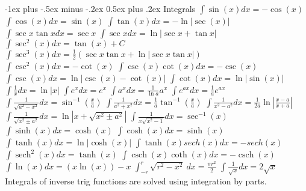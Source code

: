 \documentclass[10pt,a4paper,landscape]{article}
\makeatletter
\DeclareMathOperator{\sech}{sech}
\DeclareMathOperator{\csch}{csch}
\renewcommand{\section}{\@startsection{section}{1}{0mm}%
{-1ex plus -.5ex minus -.2ex}%
{0.5ex plus .2ex}%
{\normalfont\large\bfseries}}
\makeatother
\begin{document}
\begin{multicols*}{5}
	\section{Integrals}
	\scriptsize
	$\int \sin(x) dx = -\cos(x) $\newline
	$\int \cos(x) dx = \sin(x) $\newline
	$\int \tan(x) dx = -\ln|\sec(x) | $\newline
	$\int \sec x \tan x dx = \sec x $\newline
	$\int \sec x dx = \ln | \sec x + \tan x |$\newline 
	$\int \sec^2(x) dx = \tan(x) + C $ 
	$\int \sec^3(x) dx= \frac{1}{2}(\sec x \tan x + \ln| \sec x \tan x |)  $ 
	$\int \csc^2(x) dx= -\cot(x)$\newline
	$\int \csc (x) \cot (x) dx = - \csc(x)$\newline
	$\int \csc (x) dx = \ln | \csc (x) - \cot (x) | $\newline
	$\int \cot(x) dx = \ln|\sin(x)| $\newline
	$\int \frac{1}{x}dx = \ln|x|$\newline
	$\int e^x dx = e^x $\newline
	$\int a^x dx = \frac{1}{\ln a} a^x $\newline
	$\int e^{ax} dx = \frac{1}{a} e^{ax} $\newline
	$\int \frac{1}{\sqrt{a^2-x^2}} dx = \sin^{-1}(\frac{x}{a}) $\newline
	$\int \frac{1}{a^2+x^2} dx = \frac{1}{a} \tan^{-1}(\frac{x}{a}) $\newline
	$\int \frac{1}{x^2-a^2} dx = \frac{1}{2a} \ln |\frac{x-a}{x+a}|$\newline 
	$\int \frac{1}{\sqrt{x^2 \pm a^2}} dx=\ln |x+\sqrt{x^2 \pm a^2}|$\newline
	$\int \frac{1}{x\sqrt{x^2-1}} dx = \sec^{-1}(x) $\newline
	$\int \sinh(x) dx = \cosh(x) $\newline
	$\int \cosh(x) dx = \sinh(x) $\newline
	$\int \tanh(x) dx = \ln|\cosh(x)| $\newline
	$\int \tanh(x)sech(x) dx = -sech(x) $\newline
	$\int \sech^2(x) dx = \tanh(x) $\newline
	$\int \csch(x)\coth(x) dx = -\csch(x) $\newline
	$ \int \ln(x) dx = (x \ln(x))-x $\newline
	$ \int^r_{-r} \sqrt{ r^2 - x^2 }\ dx = \frac{ \pi r^2 }{ 2 }  $\newline
	$\int \frac{1}{\sqrt{x}} dx = 2\sqrt{x} $\newline
	Integrals of inverse trig functions are solved using integration by parts.\newline


\end{multicols*}
\end{document}
